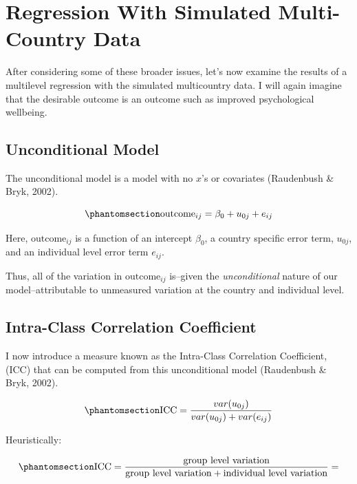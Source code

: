\documentclass[
  letterpaper,
  DIV=11,
  numbers=noendperiod]{scrreprt}
\begin{document}
\section{Regression With Simulated Multi-Country
Data}\label{sec-regression}

After considering some of these broader issues, let's now examine the
results of a multilevel regression with the simulated multicountry data.
I will again imagine that the desirable outcome is an outcome such as
improved psychological wellbeing.

\subsection{Unconditional Model}\label{sec-unconditional}

The unconditional model is a model with no \(x\)'s or covariates
(Raudenbush \& Bryk, 2002). 

\begin{equation}\phantomsection\label{eq-unconditional}{\text{outcome}_{ij} = \beta_0 + u_{0j} + e_{ij}}\end{equation}

Here, \(\text{outcome}_{ij}\) is a function of an intercept \(\beta_0\),
a country specific error term, \(u_{0j}\), and an individual level error
term \(e_{ij}\).

Thus, all of the variation in \(\text{outcome}_{ij}\) is--given the
\emph{unconditional} nature of our model--attributable to unmeasured
variation at the country and individual level.

\subsection{Intra-Class Correlation Coefficient}\label{sec-ICC}

I now introduce a measure known as the Intra-Class Correlation
Coefficient, (ICC) that can be computed from this unconditional model
(Raudenbush \& Bryk, 2002).  

\begin{equation}\phantomsection\label{eq-ICC}{\text{ICC} = \frac{var(u_{0j})}{var(u_{0j}) + var(e_{ij})}}\end{equation}

Heuristically:

\begin{equation}\phantomsection\label{eq-ICCheuristic}{\text{ICC} = \frac{\text{group level variation}}{\text{group level variation} + \text{individual level variation}} = }\end{equation}
\end{document}
